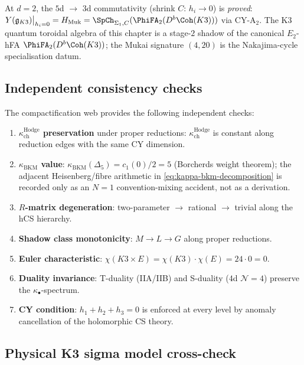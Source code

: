 \noindent At $d = 2$, the $5$d $\to$ $3$d commutativity (shrink $C$:
$h_i \to 0$) is \emph{proved}: $Y(\mathfrak{g}_{K3})\big|_{h_i = 0}
= H_{\mathrm{Muk}} = \SpCh_{\Sigma_1, C}(\PhiFA_2(D^b\Coh(K3)))$ via CY-A$_2$.
The K3 quantum toroidal algebra of this chapter is a stage-$2$ shadow of the canonical $E_2$-hFA $\PhiFA_2(D^b\Coh(K3))$; the Mukai signature $(4,20)$ is the Nakajima-cycle specialisation datum.

\subsection{Independent consistency checks}
\label{sec:web-consistency-checks}

The compactification web provides the following independent checks:

\begin{enumerate}
\item \textbf{$\kappa_{\mathrm{ch}}^{\mathrm{Hodge}}$ preservation} under proper reductions:
 $\kappa_{\mathrm{ch}}^{\mathrm{Hodge}}$ is constant along reduction edges with the same
 CY dimension.

\item \textbf{$\kappa_{\mathrm{BKM}}$ value}:
 $\kappa_{\mathrm{BKM}}(\Delta_5) = c_1(0)/2 = 5$ (Borcherds weight theorem); the adjacent Heisenberg/fibre arithmetic in \eqref{eq:kappa-bkm-decomposition} is recorded only as an $N = 1$ convention-mixing accident, not as a derivation.

\item \textbf{$R$-matrix degeneration}: two-parameter $\to$ rational
 $\to$ trivial along the hCS hierarchy.

\item \textbf{Shadow class monotonicity}: $M \to L \to G$ along
 proper reductions.

\item \textbf{Euler characteristic}: $\chi(K3 \times E)
 = \chi(K3)\cdot \chi(E) = 24 \cdot 0 = 0$.

\item \textbf{Duality invariance}: T-duality (IIA/IIB) and S-duality
 ($4$d $\mathcal{N}=4$) preserve the $\kappa_\bullet$-spectrum.

\item \textbf{CY condition}: $h_1 + h_2 + h_3 = 0$ is enforced at
 every level by anomaly cancellation of the holomorphic CS theory.
\end{enumerate}

\subsection{Physical K3 sigma model cross-check}
\label{sec:k3-sigma-model-cross-check}

